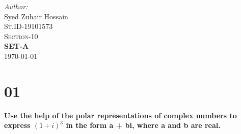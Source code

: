 \documentclass[12pt]{article}
\begin{document}
\begin{titlepage}



\Large \emph{Author:}\\
Syed Zuhair Hossain\\\textsc{St.ID-19101573\\Section-10 \\ \textbf{SET-A}}\\[2cm] %


{\large \today}\\[2cm] %

\vfill %

\end{titlepage}
\pagebreak


                


\chapter{01}
\textbf{Use the help of the polar representations of complex numbers to express $(1+i)^3$ in the form a + bi, where a and b are real.}
\end{document}
